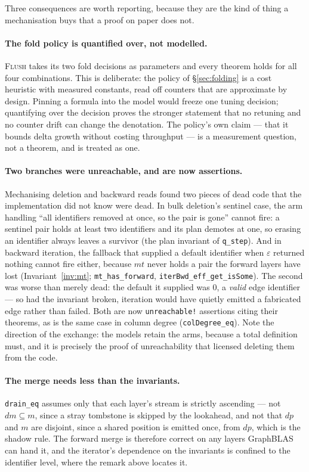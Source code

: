 \documentclass[11pt,a4paper]{article}
\theoremstyle{plain}
\theoremstyle{definition}
\theoremstyle{remark}
\begin{document}
Three consequences are worth reporting, because they are the kind of thing a
mechanisation buys that a proof on paper does not.

\paragraph{The fold policy is quantified over, not modelled.} \textsc{Flush} takes its
two fold decisions as parameters and every theorem holds for all four
combinations. This is deliberate: the policy of \S\ref{sec:folding} is a cost
heuristic with measured constants, read off counters that are approximate by
design. Pinning a formula into the model would freeze one tuning decision;
quantifying over the decision proves the stronger statement that no retuning and
no counter drift can change the denotation. The policy's own claim --- that it
bounds delta growth without costing throughput --- is a measurement question,
not a theorem, and is treated as one.

\paragraph{Two branches were unreachable, and are now assertions.} Mechanising
deletion and backward reads found two pieces of dead code that the
implementation did not know were dead. In bulk deletion's sentinel case, the arm
handling ``all identifiers removed at once, so the pair is gone'' cannot fire: a
sentinel pair holds at least two identifiers and its plan demotes at one, so
erasing an identifier always leaves a survivor (the plan invariant of
\texttt{q\_step}). And in backward iteration, the fallback that supplied a
default identifier when $\varepsilon$ returned nothing cannot fire either,
because $mt$ never holds a pair the forward layers have lost
(Invariant~\ref{inv:mt}; \texttt{mt\_has\_forward},
\texttt{iterBwd\_eff\_get\_isSome}). The second was worse than merely dead: the
default it supplied was $0$, a \emph{valid} edge identifier --- so had the
invariant broken, iteration would have quietly emitted a fabricated edge rather
than failed. Both are now \texttt{unreachable!} assertions citing their
theorems, as is the same case in column degree (\texttt{colDegree\_eq}). Note
the direction of the exchange: the models retain the arms, because a total
definition must, and it is precisely the proof of unreachability that licensed
deleting them from the code.

\paragraph{The merge needs less than the invariants.} \texttt{drain\_eq} assumes
only that each layer's stream is strictly ascending --- not $dm \subseteq m$,
since a stray tombstone is skipped by the lookahead, and not that $dp$ and $m$
are disjoint, since a shared position is emitted once, from $dp$, which is the
shadow rule. The forward merge is therefore correct on any layers GraphBLAS can
hand it, and the iterator's dependence on the invariants is confined to the
identifier level, where the remark above locates it.
\end{document}
